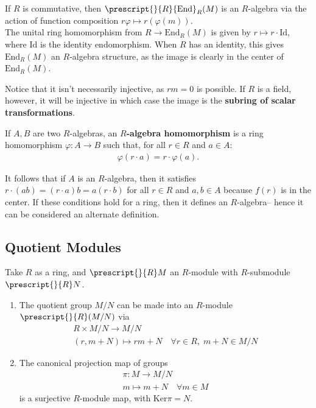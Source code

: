 \documentclass{memoir}
\begin{document}
\begin{exmp}[Endomorphism]
If \(R\) is commutative, then \(\prescript{}{R}{\textrm{End}}_R(M)\) is an \(R\)-algebra via the action of function composition \(r\varphi \mapsto r(\varphi (m))\).\\

	The unital ring homomorphism from \(R\to \textrm{End}_R(M)\) is given by \(r\mapsto r\cdot \textrm{Id}\), where \(\textrm{Id}\) is the identity endomorphism. When \(R\) has an identity, this gives \(\textrm{End}_R(M)\) an \(R\)-algebra structure, as the image is clearly in the center of \(\textrm{End}_R(M)\).
\end{exmp}
Notice that it isn't necessarily injective, as \(rm=0\) is possible. If \(R\) is a field, however, it will be injective in which case the image is the \textbf{subring of scalar transformations}.

\begin{defn}
	If \(A,B\) are two \(R\)-algebras, an \textbf{\(R\)-algebra homomorphism} is a ring homomorphism \(\varphi :A\to B\) such that, for all \(r \in R\) and \(a \in A\):
	\begin{align*}
		\varphi (r\cdot a) = r\cdot \varphi (a).
	\end{align*}
\end{defn}
It follows that if \(A\) is an \(R\)-algebra, then it satisfies \(r\cdot (ab) = (r\cdot a)b = a(r\cdot b)\) for all \(r \in R\) and \(a,b \in A\) because \(f(r)\) is in the center. If these conditions hold for a ring, then it defines an \(R\)-algebra-- hence it can be considered an alternate definition.

\subsection{Quotient Modules}
\begin{prop}
	Take \(R\) as a ring, and \(\prescript{}{R}M\) an \(R\)-module with \(R\)-submodule \(\prescript{}{R}N\).
	\begin{enumerate}
		\item The quotient group \(M / N\) can be made into an \(R\)-module \(\prescript{}{R}(M / N)\) via
			\begin{align*}
				R\times M / N \to M / N\\
				(r,m+N) \mapsto rm + N \quad \forall r \in R, \; m+N \in M / N
			\end{align*}
		\item The canonical projection map of groups
			\begin{align*}
				\pi:M\to M / N\\
				m\mapsto m+N \quad \forall m \in M
			\end{align*}
			is a surjective \(R\)-module map, with \( \textrm{Ker}\pi = N\).
	\end{enumerate}
\end{prop}
\end{document}

